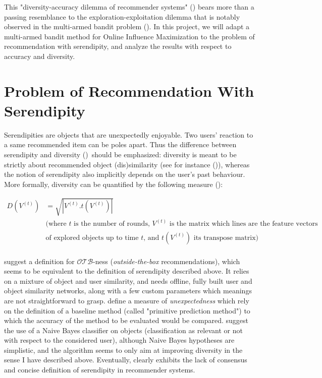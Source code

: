\documentclass{article}
\begin{document}
This "diversity-accuracy dilemma of recommender systems" (\cite{zhou2010solving}) bears more than a passing resemblance to the exploration-exploitation dilemma that is notably observed in the multi-armed bandit problem (\cite{auer2002finite}). In this project, we will adapt a multi-armed bandit method for Online Influence Maximization to the problem of recommendation with serendipity, and analyze the results with respect to accuracy and diversity.

\section{Problem of Recommendation With Serendipity}

Serendipities are objects that are unexpectedly enjoyable. Two users' reaction to a same recommended item can be poles apart. Thus the difference between serendipity and diversity (\cite{abbassi2009getting}) should be emphasized: diversity is meant to be strictly about recommended object (dis)similarity (see for instance (\cite{ziegler2005improving})), whereas the notion of serendipity also implicitly depends on the user's past behaviour. More formally, diversity can be quantified by the following measure (\cite{vie2016modeles}):

\begin{equation}\label{eq:01}
\begin{split}
D(V^{(t)}) & = \sqrt{|V^{(t)}.t(V^{(t)})|}\\
& \mbox{(where $t$ is the number of rounds, $V^{(t)}$ is the matrix which lines are the feature vectors}\\
& \mbox{of explored objects up to time $t$, and $t(V^{(t)})$ its transpose matrix)}\\
\end{split}
\end{equation}

\citet{abbassi2009getting} suggest a definition for $\mathscr{O}\mathscr{T}\mathscr{B}$-ness (\textit{outside-the-box} recommendations), which seems to be equivalent to the definition of serendipity described above. It relies on a mixture of object and user similarity, and needs offline, fully built user and object similarity networks, along with a few custom parameters which meanings are not straightforward to grasp. \citet{murakami2007metrics} define a measure of \emph{unexpectedness} which rely on the definition of a baseline method (called "primitive prediction method") to which the accuracy of the method to be evaluated would be compared. \citet{iaquinta2008introducing} suggest the use of a Naive Bayes classifier on objects (classification as relevant or not with respect to the considered user), although Naive Bayes hypotheses are simplistic, and the algorithm seems to only aim at improving diversity in the sense I have described above. Eventually, \citet{kotkov2016survey} clearly exhibits the lack of consensus and concise definition of serendipity in recommender systems.
\end{document}
